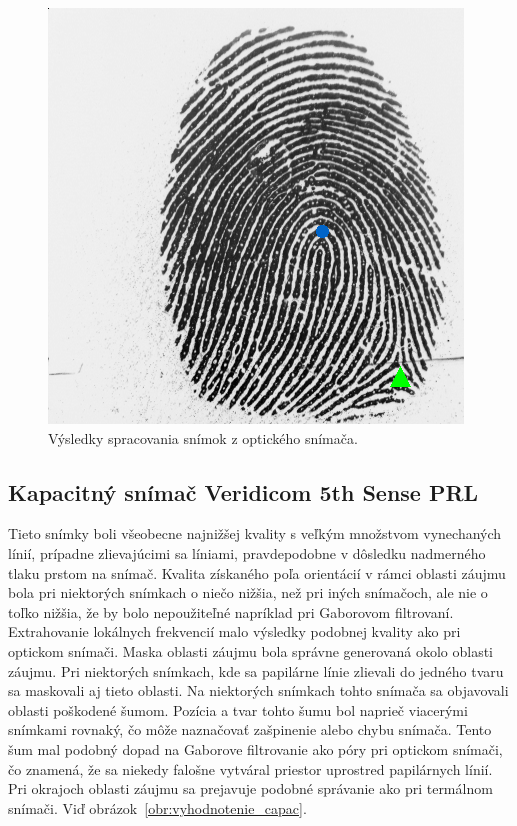 \begin{figure}[h]
    \includegraphics[width=0.32\linewidth]{obrazky-figures/eval_results/optical_singularities.png}
    \caption{Výsledky spracovania snímok z optického snímača.}
    \label{obr:vyhodnotenie_optical}
  \end{figure}

  \subsection{Kapacitný snímač Veridicom 5th Sense PRL}
  Tieto snímky boli všeobecne najnižšej kvality s veľkým množstvom vynechaných línií, prípadne zlievajúcimi sa líniami, pravdepodobne v dôsledku nadmerného
  tlaku prstom na snímač. Kvalita získaného poľa orientácií v rámci oblasti záujmu bola pri niektorých snímkach o niečo nižšia, než pri iných snímačoch, ale
  nie o toľko nižšia, že by bolo nepoužiteľné napríklad pri Gaborovom filtrovaní. Extrahovanie lokálnych frekvencií malo výsledky podobnej kvality ako pri
  optickom snímači. Maska oblasti záujmu bola správne generovaná okolo oblasti záujmu. Pri niektorých snímkach, kde sa papilárne línie zlievali do jedného
  tvaru sa maskovali aj tieto oblasti.
  Na niektorých snímkach tohto snímača sa objavovali oblasti poškodené šumom. Pozícia a tvar tohto šumu bol naprieč viacerými snímkami rovnaký, čo môže
  naznačovať zašpinenie alebo chybu snímača. Tento šum mal podobný dopad na Gaborove filtrovanie ako póry pri optickom snímači, čo znamená, že sa niekedy
  falošne vytváral priestor uprostred papilárnych línií. Pri okrajoch oblasti záujmu sa prejavuje podobné správanie ako pri termálnom snímači.
  Viď obrázok~{\ref{obr:vyhodnotenie_capac}}.
